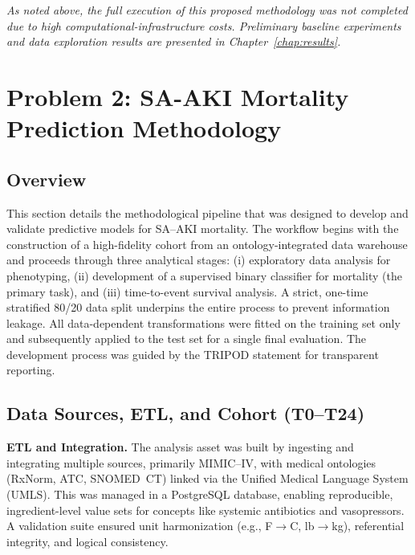 \medskip
\noindent\emph{As noted above, the full execution of this proposed methodology was not completed due to high computational-infrastructure costs. Preliminary baseline experiments and data exploration results are presented in Chapter~\ref{chap:results}.}



\section{Problem 2: SA-AKI Mortality Prediction Methodology}\label{sec:p2:methodology}

\subsection{Overview}
This section details the methodological pipeline that was designed to develop and validate predictive models for SA--AKI mortality. The workflow begins with the construction of a high-fidelity cohort from an ontology-integrated data warehouse and proceeds through three analytical stages: (i) exploratory data analysis for phenotyping, (ii) development of a supervised binary classifier for mortality (the primary task), and (iii) time-to-event survival analysis. A strict, one-time stratified 80/20 data split underpins the entire process to prevent information leakage. All data-dependent transformations were fitted on the training set only and subsequently applied to the test set for a single final evaluation. The development process was guided by the TRIPOD statement for transparent reporting.

\subsection{Data Sources, ETL, and Cohort (T0--T24)}
\textbf{ETL and Integration.} The analysis asset was built by ingesting and integrating multiple sources, primarily MIMIC--IV, with medical ontologies (RxNorm, ATC, SNOMED~CT) linked via the Unified Medical Language System (UMLS). This was managed in a PostgreSQL database, enabling reproducible, ingredient-level value sets for concepts like systemic antibiotics and vasopressors. A validation suite ensured unit harmonization (e.g., F$\rightarrow$C, lb$\rightarrow$kg), referential integrity, and logical consistency.

